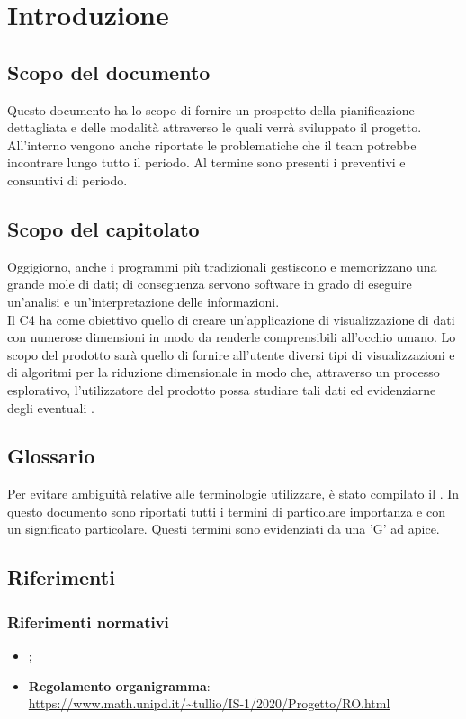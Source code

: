 \section{Introduzione}

\subsection{Scopo del documento}
Questo documento ha lo scopo di fornire un prospetto della pianificazione dettagliata e delle modalità attraverso le quali verrà sviluppato il progetto. All'interno vengono anche riportate le problematiche che il team potrebbe incontrare lungo tutto il periodo. Al termine sono presenti i preventivi e consuntivi di periodo.

\subsection{Scopo del capitolato}
Oggigiorno, anche i programmi più tradizionali gestiscono e memorizzano una grande mole di dati; di conseguenza servono software in grado di eseguire un'analisi e un'interpretazione delle informazioni.\\
Il  C4 ha come obiettivo quello di creare un'applicazione di visualizzazione di dati con numerose dimensioni in modo da renderle comprensibili all'occhio umano.  Lo scopo del prodotto sarà quello di fornire all'utente diversi tipi di visualizzazioni e di algoritmi per la riduzione dimensionale in modo che, attraverso un processo esplorativo, l'utilizzatore del prodotto possa studiare tali dati ed evidenziarne degli eventuali . 

\subsection{Glossario}
Per evitare ambiguità relative alle terminologie utilizzare, è stato compilato il . In questo documento sono riportati tutti i termini di particolare importanza e con un significato particolare. Questi termini sono evidenziati da una 'G' ad apice.

\subsection{Riferimenti}
\subsubsection{Riferimenti normativi}
\begin{itemize}	
	\item \textbf{};
	
	\item \textbf{Regolamento organigramma}:\\
	\textcolor{blue}{\url{https://www.math.unipd.it/~tullio/IS-1/2020/Progetto/RO.html}}
\end{itemize}


